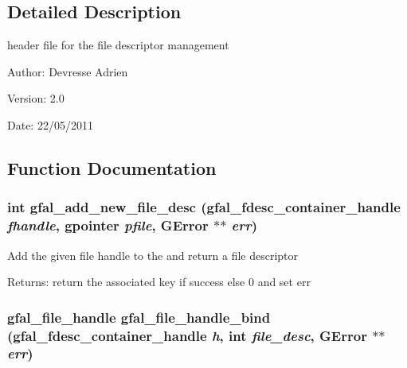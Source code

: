 \subsection{Detailed Description}
header file for the file descriptor management 

\begin{Desc}
\item[Author:]Devresse Adrien \end{Desc}
\begin{Desc}
\item[Version:]2.0 \end{Desc}
\begin{Desc}
\item[Date:]22/05/2011 \end{Desc}


\subsection{Function Documentation}
\subsubsection{\setlength{\rightskip}{0pt plus 5cm}int gfal\_\-add\_\-new\_\-file\_\-desc (gfal\_\-fdesc\_\-container\_\-handle {\em fhandle}, gpointer {\em pfile}, GError $\ast$$\ast$ {\em err})}\label{gfal__common__filedescriptor_8h_8ab30d677c0c3d4a635a35c395524fea}


Add the given file handle to the and return a file descriptor \begin{Desc}
\item[Returns:]return the associated key if success else 0 and set err \end{Desc}
\subsubsection{\setlength{\rightskip}{0pt plus 5cm}gfal\_\-file\_\-handle gfal\_\-file\_\-handle\_\-bind (gfal\_\-fdesc\_\-container\_\-handle {\em h}, int {\em file\_\-desc}, GError $\ast$$\ast$ {\em err})}\label{gfal__common__filedescriptor_8h_b1a9b764baa7c997a354d18bbe43e2cb}



